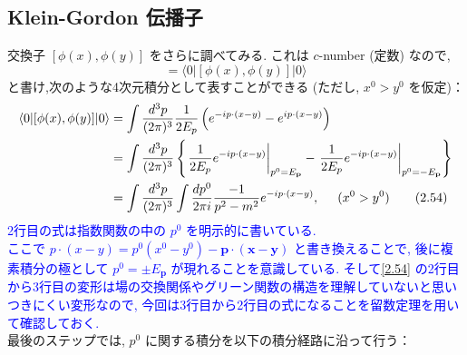 \documentclass[a4paper,12pt]{article}
\begin{document}
\subsection*{Klein-Gordon 伝播子}
交換子 $[\phi(x), \phi(y)]$ をさらに調べてみる. これは $c$-number (定数) なので,
\begin{equation*}
[\phi(x), \phi(y)] = \langle 0 | [\phi(x), \phi(y)] | 0 \rangle
\end{equation*}
と書け,次のような4次元積分として表すことができる (ただし, $x^0 > y^0$ を仮定)：
\begin{align*}
\langle 0 | [\phi(x), \phi(y)] | 0 \rangle &= \int \frac{d^3 p}{(2\pi)^3} \frac{1}{2E_p} \left( e^{-ip \cdot (x - y)} - e^{ip \cdot (x - y)} \right) \\
&= \int \frac{d^3 p}{(2\pi)^3} \left\{ \left.\frac{1}{2E_p} e^{-ip \cdot (x - y)}\right|_{p^0 = E_{\mathbf{p}}} - \left.\frac{1}{2E_p} e^{-ip \cdot (x - y)}\right|_{p^0 = -E_{\mathbf{p}}} \right\}\\
&= \int \frac{d^3 p}{(2\pi)^3} \int \frac{dp^0}{2\pi i}\frac{-1}{p^2 -m^2} e^{-ip \cdot (x - y)},\hspace{0.5cm} (x^0 > y^0) \label{2.54}\tag{2.54}
\end{align*}
\textcolor{blue}{2行目の式は指数関数の中の $p^0$ を明示的に書いている.\\
ここで $p \cdot (x - y) = p^0 (x^0 - y^0) - \mathbf{p} \cdot (\mathbf{x} - \mathbf{y})$ と書き換えることで, 後に複素積分の極として $p^0 = \pm E_{\mathbf{p}}$ が現れることを意識している. そして\eqref{2.54} の2行目から3行目の変形は場の交換関係やグリーン関数の構造を理解していないと思いつきにくい変形なので, 今回は3行目から2行目の式になることを留数定理を用いて確認しておく.}\\


最後のステップでは, $p^0$ に関する積分を以下の積分経路に沿って行う：

\begin{figure}[H]
    \centering
\end{figure}
\end{document}
